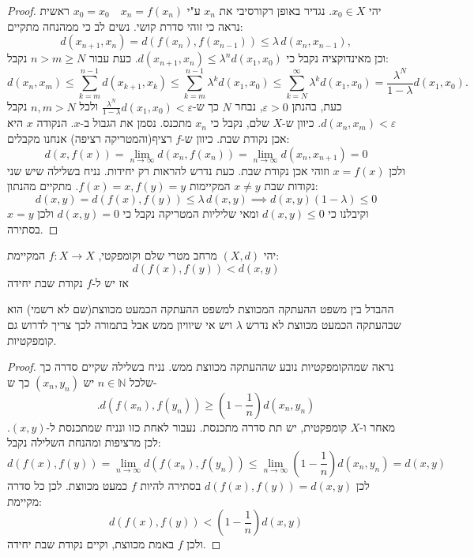 \documentclass{tstextbook}
\begin{document}
\begin{proof}
יהי \(x_{0}\in X\). נגדיר באופן רקורסיבי את \(x_{n}\) ע"י \(x_{0}=x_{0}\quad  x_{n}=f(x_{n})\)
ראשית נראה כי זוהי סדרת קושי. נשים לב כי ממהנחה מתקיים:
$$d(x_{n+1},x_{n})=d(f(x_{n}),f(x_{n-1}))\leq\lambda\,d(x_{n},x_{n-1}),$$
וכן מאינדוקציה נקבל כי \(d(x_{n+1},x_{n})\leq \lambda^nd(x_{1},x_{0})\). כעת עבור \(n>m\geq N\) נקבל:
$${{d(x_{n},x_{m})\leq\displaystyle\sum_{k=m}^{n-1}d(x_{k+1},x_{k})\leq\displaystyle\sum_{k=m}^{n-1}\lambda^{k}d(x_{1},x_{0})}}{{\leq\displaystyle\sum_{k=N}^{\infty}\lambda^{k}d(x_{1},x_{0})=\displaystyle\frac{\lambda^{N}}{1-\lambda}d(x_{1},x_{0}).}}$$
כעת, בהנתן \(\varepsilon>0\), נבחר \(N\) כך ש-\(\frac{\lambda^N}{1-\lambda}d(x_{1},x_{0})<\varepsilon\) ולכל \(n,m>N\) נקבל \(d(x_{n},x_{m})<\varepsilon\). כיוון ש-\(X\) שלם, נקבל כי \(x_{n}\) מתכנס. נסמן את הגבול ב-\(x\). הנקודה \(x\) היא אכן נקודת שבת. כיוון ש-\(f\) רציף(והמטריקה רציפה) אנחנו מקבלים:
$$d(x,f(x))=\operatorname*{lim}_{n\to\infty}d(x_{n},f(x_{n}))=\operatorname*{lim}_{n\to\infty}d(x_{n},x_{n+1})=0$$
ולכן \(x=f(x)\) וזוהי אכן נקודת שבת. כעת נדרש להראות רק יחידות.
נניח בשלילה שיש שני נקודות שבת \(x\neq y\) המקיימות \(f(x)=x,f(y)=y\). מתקיים מהנתון:
$$d(x,y)=d(f(x),f(y))\leq\lambda\,d(x,y)\implies d(x,y)\left( 1-\lambda \right)\leq 0$$
וקיבלנו כי \(d(x,y)\leq 0\) ומאי שליליות המטריקה נקבל כי \(d(x,y)=0\) ולכן \(x=y\) בסתירה.

\end{proof}
\begin{theorem}
יהי \((X,d)\) מרחב מטרי שלם וקומפקטי, \(f:X\to X\) המקיימת:
$$d(f(x),f(y))< d(x,y)$$
אז יש ל-\(f\) נקודת שבת יחידה

\end{theorem}
\begin{remark}
ההבדל בין משפט ההעתקה המכווצת למשפט ההעתקה הכמעט מכווצת(שם לא רשמי) הוא שבהעתקה הכמעט מכווצת לא נדרש \(\lambda\) ויש אי שיוויון ממש אבל בתמורה לכך צריך לדרוש גם קומפקטיות.

\end{remark}
\begin{proof}
נראה שמהקומפקטיות נובע שההעתקה מכווצת ממש. 
נניח בשלילה שקיים סדרה כך שלכל \(n\in\mathbb{N}\) יש \((x_{n},y_{n})\) כך ש-
$$.d(f(x_{n}),f(y_{n}))\geq\left( 1-{\textstyle{\frac{1}{n}}} \right)d(x_{n},y_{n})$$
מאחר ו-\(X\) קומפקטית, יש תת סדרה מתכנסת. נעבור לאחת כזו ונניח שמתכנסת ל-\((x,y)\).
לכן מרציפות ומהנחת השלילה נקבל:
$$d(f(x),f(y))=\operatorname*{lim}_{n\to\infty}d(f(x_{n}),f(y_{n}))\leq\operatorname*{lim}_{n\to\infty}(1-{\frac{1}{n}})d(x_{n},y_{n})=d(x,y)$$
לכן \(d(f(x),f(y))=d(x,y)\) בסתירה להיות \(f\) כמעט מכווצת. לכן כל סדרה מקיימת:
$$d(f(x),f(y))<(1-{\textstyle{\frac{1}{n}}})d(x,y)$$
ולכן \(f\) באמת מכווצת, וקיים נקודת שבת יחידה.

\end{proof}
\end{document}
